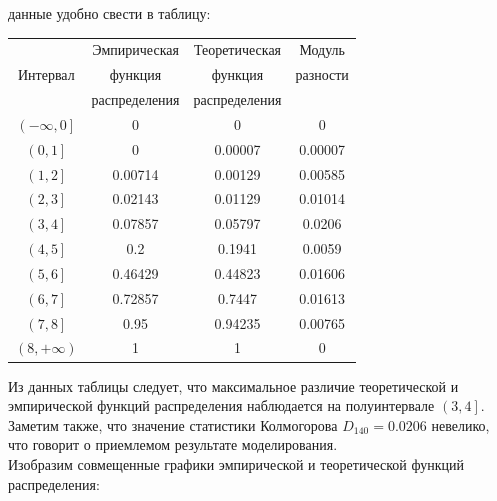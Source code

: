 \documentclass[a4paper, 14pt]{extarticle}
\begin{document}
данные удобно свести в таблицу:

\begin{table}[h!]
  \centering
  \renewcommand{\arraystretch}{1.4}
  \begin{adjustbox}{max width=0.6\textwidth}
    \begin{tabular}{|c|c|c|c|}
    \hline

    \multirow{3}{*}{Интервал} & Эмпирическая  & Теоретическая  & Модуль   \\
                              & функция       & функция        & разности \\
                              & распределения & распределения  &          \\

    \hline
    $\left( -\infty, 0 \right]$ & 0 & 0 & 0 \\
    \hline
    $\left( 0, 1 \right]$ & 0 & 0.00007 & 0.00007 \\
    \hline
    $\left( 1, 2 \right]$ & 0.00714 & 0.00129 & 0.00585 \\
    \hline
    $\left( 2, 3 \right]$ & 0.02143 & 0.01129 & 0.01014 \\
    \hline
    $\left( 3, 4 \right]$ & 0.07857 & 0.05797 & 0.0206 \\
    \hline
    $\left( 4, 5 \right]$ & 0.2 & 0.1941 & 0.0059 \\
    \hline
    $\left( 5, 6 \right]$ & 0.46429 & 0.44823 & 0.01606 \\
    \hline
    $\left( 6, 7 \right]$ & 0.72857 & 0.7447 & 0.01613 \\
    \hline
    $\left( 7, 8 \right]$ & 0.95 & 0.94235 & 0.00765 \\
    \hline
    $\left( 8, +\infty \right)$ & 1 & 1 & 0 \\
    \hline
    \end{tabular}
  \end{adjustbox}
\end{table}


Из данных таблицы следует, что максимальное различие теоретической и 
эмпирической функций распределения наблюдается на  полуинтервале $\left( 3, 4 \right]$.
Заметим  также,  что  значение  статистики Колмогорова $D_{140} = 0.0206$ невелико, что 
говорит о приемлемом результате моделирования.\\

Изобразим совмещенные графики эмпирической и теоретической функций распределения:
\end{document}
